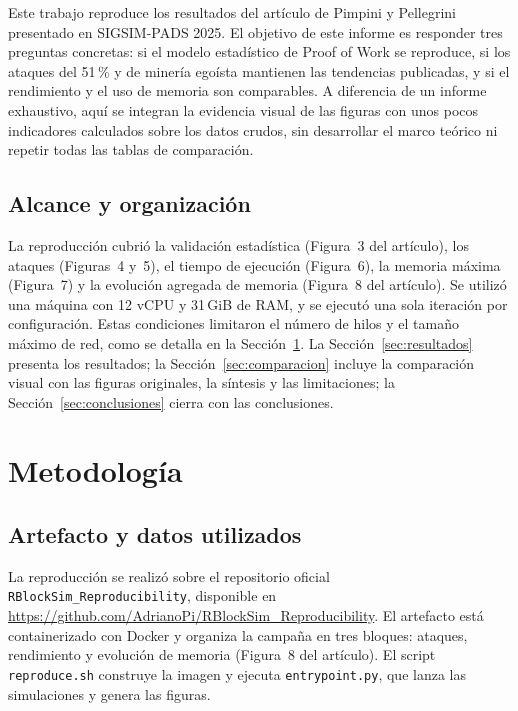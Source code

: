 \documentclass[11pt,a4paper,oneside]{article}
\begin{document}
Este trabajo reproduce los resultados del artículo de Pimpini y Pellegrini presentado en SIGSIM-PADS 2025. El objetivo de este informe es responder tres preguntas concretas: si el modelo estadístico de Proof of Work se reproduce, si los ataques del 51\,\% y de minería egoísta mantienen las tendencias publicadas, y si el rendimiento y el uso de memoria son comparables. A diferencia de un informe exhaustivo, aquí se integran la evidencia visual de las figuras con unos pocos indicadores calculados sobre los datos crudos, sin desarrollar el marco teórico ni repetir todas las tablas de comparación.

\subsection{Alcance y organización}

La reproducción cubrió la validación estadística (Figura~3 del artículo), los ataques (Figuras~4 y~5), el tiempo de ejecución (Figura~6), la memoria máxima (Figura~7) y la evolución agregada de memoria (Figura~8 del artículo). Se utilizó una máquina con 12 vCPU y 31\,GiB de RAM, y se ejecutó una sola iteración por configuración. Estas condiciones limitaron el número de hilos y el tamaño máximo de red, como se detalla en la Sección~\ref{sec:metodologia}. La Sección~\ref{sec:resultados} presenta los resultados; la Sección~\ref{sec:comparacion} incluye la comparación visual con las figuras originales, la síntesis y las limitaciones; la Sección~\ref{sec:conclusiones} cierra con las conclusiones.

\section{Metodología}
\label{sec:metodologia}

\subsection{Artefacto y datos utilizados}

La reproducción se realizó sobre el repositorio oficial \texttt{RBlockSim\_Reproducibility}, disponible en \url{https://github.com/AdrianoPi/RBlockSim_Reproducibility}. El artefacto está containerizado con Docker y organiza la campaña en tres bloques: ataques, rendimiento y evolución de memoria (Figura~8 del artículo). El script \texttt{reproduce.sh} construye la imagen y ejecuta \texttt{entrypoint.py}, que lanza las simulaciones y genera las figuras.
\end{document}
